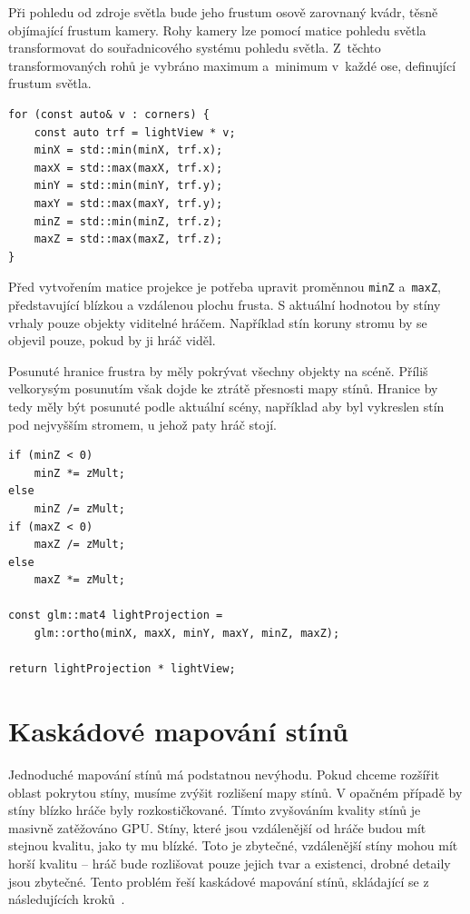 \documentclass[thesis=M,czech]{FITthesis}[2019/12/23]
\begin{document}
Při pohledu od zdroje světla bude jeho frustum osově zarovnaný kvádr, těsně objímající frustum kamery. Rohy kamery lze pomocí matice pohledu světla transformovat do souřadnicového systému pohledu světla. Z~těchto transformovaných rohů je vybráno maximum a~minimum v~každé ose, definující frustum světla.

\begin{verbatim}
for (const auto& v : corners) {
    const auto trf = lightView * v;
    minX = std::min(minX, trf.x);
    maxX = std::max(maxX, trf.x);
    minY = std::min(minY, trf.y);
    maxY = std::max(maxY, trf.y);
    minZ = std::min(minZ, trf.z);
    maxZ = std::max(maxZ, trf.z);
}
\end{verbatim}

Před vytvořením matice projekce je potřeba upravit proměnnou \texttt{minZ} a~\texttt{maxZ}, představující blízkou a vzdálenou plochu frusta. S aktuální hodnotou by stíny vrhaly pouze objekty viditelné hráčem. Například stín koruny stromu by se objevil pouze, pokud by ji hráč viděl.

Posunuté hranice frustra by měly pokrývat všechny objekty na scéně. Příliš velkorysým posunutím však dojde ke ztrátě přesnosti mapy stínů. Hranice by tedy měly být posunuté podle aktuální scény, například aby byl vykreslen stín pod nejvyšším stromem, u jehož paty hráč stojí.


\begin{verbatim}
if (minZ < 0) 
    minZ *= zMult;
else 
    minZ /= zMult;
if (maxZ < 0) 
    maxZ /= zMult;
else 
    maxZ *= zMult;

const glm::mat4 lightProjection = 
    glm::ortho(minX, maxX, minY, maxY, minZ, maxZ);

return lightProjection * lightView;
\end{verbatim}

\section{Kaskádové mapování stínů}

Jednoduché mapování stínů má podstatnou nevýhodu. Pokud chceme rozšířit oblast pokrytou stíny, musíme zvýšit rozlišení mapy stínů. V opačném případě by stíny blízko hráče byly rozkostičkované. Tímto zvyšováním kvality stínů je masivně zatěžováno GPU. Stíny, které jsou vzdálenější od hráče budou mít stejnou kvalitu, jako ty mu blízké. Toto je zbytečné, vzdálenější stíny mohou mít horší kvalitu – hráč bude rozlišovat pouze jejich tvar a existenci, drobné detaily jsou zbytečné. Tento problém řeší kaskádové mapování stínů, skládající se z následujících kroků~\cite{lopgl_csm}.
\end{document}
